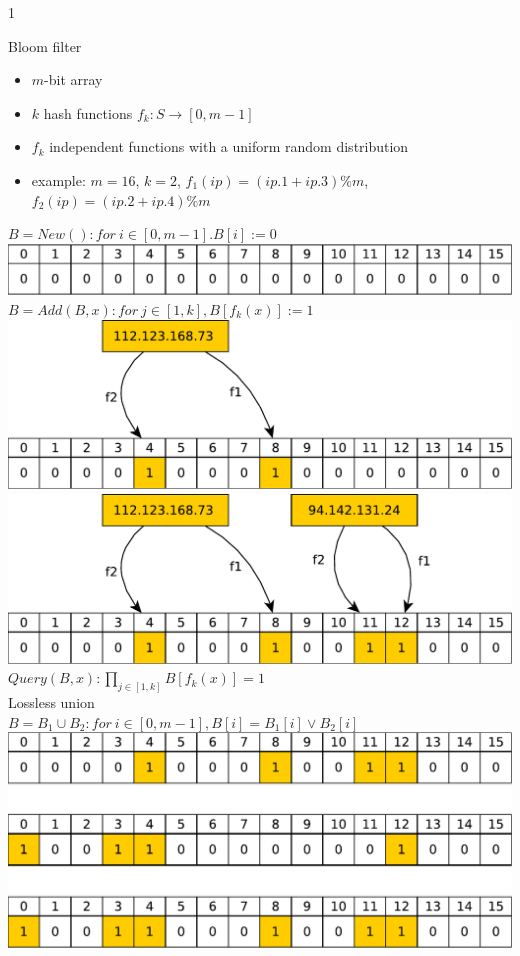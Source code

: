 1\documentclass{beamer}
\begin{document}
\begin{frame}[t]{Bloom filter}
  \begin{itemize}
  \item $m$-bit array
  \item $k$ hash functions $f_k : S \rightarrow [0, m-1]$
  \item $f_k$ independent functions with a uniform random distribution
  \item example: $m = 16$, $k=2$, $f_1(ip) = (ip.1+ip.3) \% m$,
    $f_2(ip) = (ip.2+ip.4) \% m$
  \end{itemize}
   {
  $B = New() : for\  i \in [0, m-1]. B[i] := 0$\\
  \includegraphics[width=0.8\linewidth]{bloom0}
  }
   {
  $B = Add(B, x): for\ j \in [1,k], B[f_k(x)] := 1$\\
  }
   {
  \includegraphics[width=0.8\linewidth]{bloom1}
  }
   {
  \includegraphics[width=0.8\linewidth]{bloom2}
  }
   {
  $Query(B, x): \prod_{j \in [1,k]} B[f_k(x)] = 1$\\
  }
   {
  Lossless union\\
  $B = B_1 \cup B_2: for\ i \in [0,m-1], B[i] = B_1[i] \vee B_2[i]$\\
  \includegraphics[width=0.8\linewidth]{bloom3}
}
\end{frame}
\end{document}
